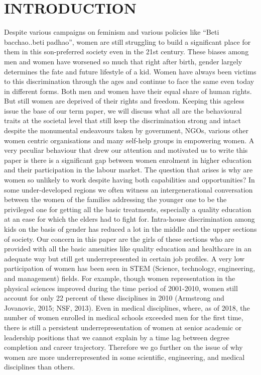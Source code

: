 \documentclass[12pt]{article}
\begin{document}
\section{INTRODUCTION}
Despite various campaigns on feminism and various policies like “Beti bacchao..beti
padhao”, women are still struggling to build a significant place for them in this son-preferred
society even in the 21st century. These biases among men and women have worsened so much
that right after birth, gender largely determines the fate and future lifestyle of a kid. Women
have always been victims to this discrimination through the ages and continue to face the
same even today in different forms. Both men and women have their equal share of human
rights. But still women are deprived of their rights and freedom.
Keeping this ageless issue the base of our term paper, we will discuss what all are the
behavioural traits at the societal level that still keep the discrimination strong and intact
despite the monumental endeavours taken by government, NGOs, various other women
centric organisations and many self-help groups in empowering women. A very peculiar
behaviour that drew our attention and motivated us to write this paper is there is a significant
gap between women enrolment in higher education and their participation in the labour
market. The question that arises is why are women so unlikely to work despite having both
capabilities and opportunities? In some under-developed regions we often witness an
intergenerational conversation between the women of the families addressing the younger
one to be the privileged one for getting all the basic treatments, especially a quality education
at an ease for which the elders had to fight for. Intra-house discrimination among kids on the
basis of gender has reduced a lot in the middle and the upper sections of society. Our concern
in this paper are the girls of these sections who are provided with all the basic amenities like
quality education and healthcare in an adequate way but still get underrepresented in certain
job profiles. A very low participation of women has been seen in STEM (Science,
technology, engineering, and management) fields. For example, though women
representation in the physical sciences improved during the time period of 2001-2010,
women still account for only 22 percent of these disciplines in 2010 (Armstrong and
Jovanovic, 2015; NSF, 2013). Even in medical disciplines, where, as of 2018, the number of
women enrolled in medical schools exceeded men for the first time, there is still a persistent
underrepresentation of women at senior academic or leadership positions that we cannot
explain by a time lag between degree completion and career trajectory. Therefore we go
further on the issue of why women are more underrepresented in some scientific,
engineering, and medical disciplines than others.
\end{document}
